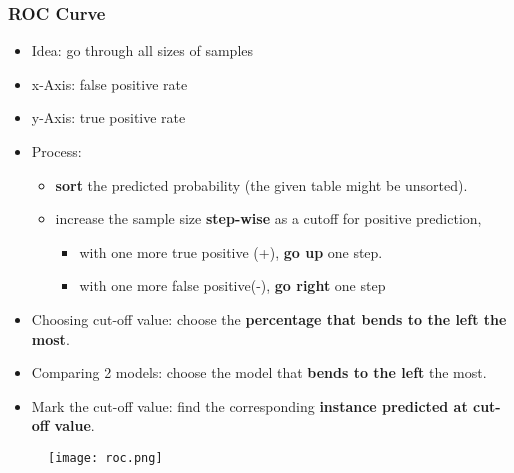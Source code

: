 \subsubsection{ROC Curve}
\begin{itemize}
	\item Idea: go through all sizes of samples
	\item x-Axis: false positive rate
	\item y-Axis: true positive rate
	\item Process: 
	\begin{itemize}
		\item \textbf{sort} the predicted probability (the given table might be unsorted).
		\item increase the sample size \textbf{step-wise} as a cutoff for positive prediction, 
		\begin{itemize}
			\item with one more true positive (+), \textbf{go up} one step.
			\item with one more false positive(-), \textbf{go right} one step
		\end{itemize}
		 
	\end{itemize}
	\item Choosing cut-off value: choose the \textbf{percentage that bends to the left the most}.
	\item Comparing 2 models: choose the model that \textbf{bends to the left} the most.
	\item Mark the cut-off value: find the corresponding \textbf{instance predicted at cut-off value}.
\end{itemize}
\begin{figure}[H]
	\centering
	\texttt{[image: roc.png]}
\end{figure} 
